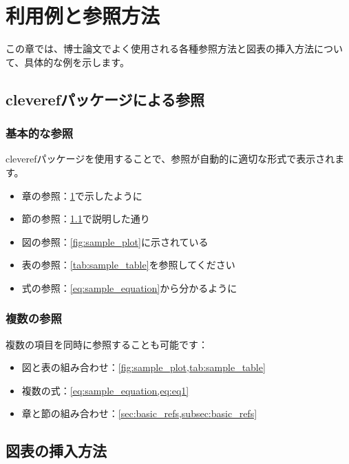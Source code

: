 \documentclass[../main/main.tex]{subfiles}
\begin{document}
\chapter{利用例と参照方法}
\label{chap:examples}

この章では、博士論文でよく使用される各種参照方法と図表の挿入方法について、具体的な例を示します。

\section{cleverefパッケージによる参照}
\label{sec:basic_refs}

\subsection{基本的な参照}
\label{subsec:basic_refs}

cleverefパッケージを使用することで、参照が自動的に適切な形式で表示されます。

\begin{itemize}
    \item 章の参照：\cref{chap:examples}で示したように
    \item 節の参照：\cref{sec:basic_refs}で説明した通り
    \item 図の参照：\cref{fig:sample_plot}に示されている
    \item 表の参照：\cref{tab:sample_table}を参照してください
    \item 式の参照：\cref{eq:sample_equation}から分かるように
\end{itemize}

\subsection{複数の参照}

複数の項目を同時に参照することも可能です：

\begin{itemize}
    \item 図と表の組み合わせ：\cref{fig:sample_plot,tab:sample_table}
    \item 複数の式：\cref{eq:sample_equation,eq:eq1}
    \item 章と節の組み合わせ：\cref{sec:basic_refs,subsec:basic_refs}
\end{itemize}

\section{図表の挿入方法}
\end{document}
